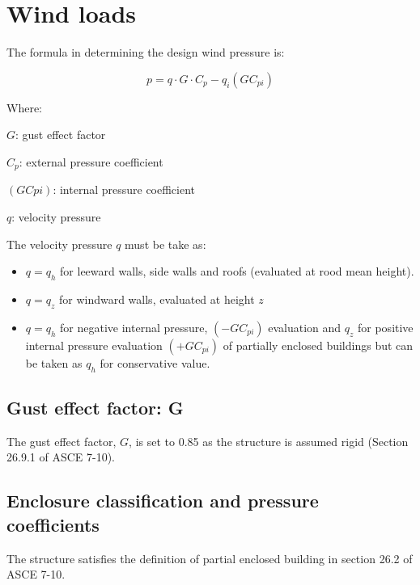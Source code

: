 \documentclass[a4paper,11pt]{xc_memo}
\begin{document}
\maketitle

\section{Wind loads}

The formula in determining the design wind pressure is:

\begin{equation}
  p= q \cdot G \cdot C_p - q_i(GC_{pi})
\end{equation}

\noindent Where:
\begin{description}
  \item{$G$}: gust effect factor
  \item{$C_p$}: external pressure coefficient
  \item{$(GCpi)$}: internal pressure coefficient
  \item{$q$}: velocity pressure
\end{description}

\noindent The velocity pressure $q$ must be take as:
\begin{itemize}
\item $q= q_h$ for leeward walls, side walls and roofs (evaluated at rood mean height).
\item $q= q_z$ for windward walls, evaluated at height $z$
\item $q= q_h$ for negative internal pressure, $(-GC_{pi})$ evaluation and $q_z$ for positive internal pressure evaluation $(+GC_{pi})$ of partially enclosed buildings but can be taken as $q_h$ for conservative value.
\end{itemize}

\subsection{Gust effect factor: G}
The gust effect factor, $G$, is set to 0.85 as the structure is assumed rigid (Section 26.9.1 of ASCE 7-10).

\subsection{Enclosure classification and pressure coefficients}
The structure satisfies the definition of partial enclosed building in section 26.2 of ASCE 7-10.
\end{document}
